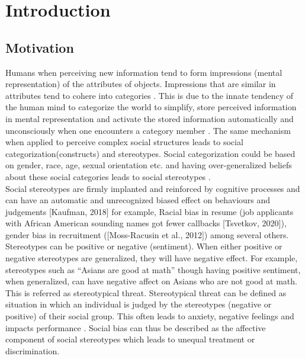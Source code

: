 \chapter{Introduction}
\section{Motivation}

Humans when perceiving new information tend to form impressions (mental representation) of the attributes of objects. Impressions that are similar in attributes tend to cohere into categories \cite{fiske1998stereotyping}\cite{allport1954nature}. This is due to the innate tendency of the human mind to categorize the world to simplify, store perceived information in mental representation and activate the stored information automatically and unconsciously when one encounters
a category member \cite{ComputationalEthics}. The same mechanism when applied to perceive complex social structures leads to social categorization(constructs) and stereotypes. Social categorization could be based on gender, race, age, sexual orientation etc. and having over-generalized beliefs about these social categories leads to social stereotypes \cite{beukeboom2019stereotypes}\cite{ComputationalEthics}.	
\\

Social stereotypes are firmly implanted and reinforced by cognitive processes and can have
an automatic and unrecognized biased effect on behaviours and judgements [Kaufman, 2018]
for example, Racial bias in resume (job applicants with African American sounding names
got fewer callbacks [Tsvetkov, 2020]), gender bias in recruitment ([Moss-Racusin et al., 2012])
among several others. Stereotypes can be positive or negative (sentiment). When either positive or negative stereotypes are generalized, they will have negative effect. For example, stereotypes such as “Asians are good at math” though having positive sentiment, when generalized, can have negative affect on Asians who are not good at math. This is referred as stereotypical threat. Stereotypical threat can be defined as situation in which an individual is judged by the stereotypes (negative or positive) of their social group. This often leads to anxiety, negative feelings and impacts performance \cite{beukeboom2019stereotypes}\cite{spencer2016stereotype}. Social
bias can thus be described as the affective component of social stereotypes which leads to unequal treatment or
discrimination.
\\

